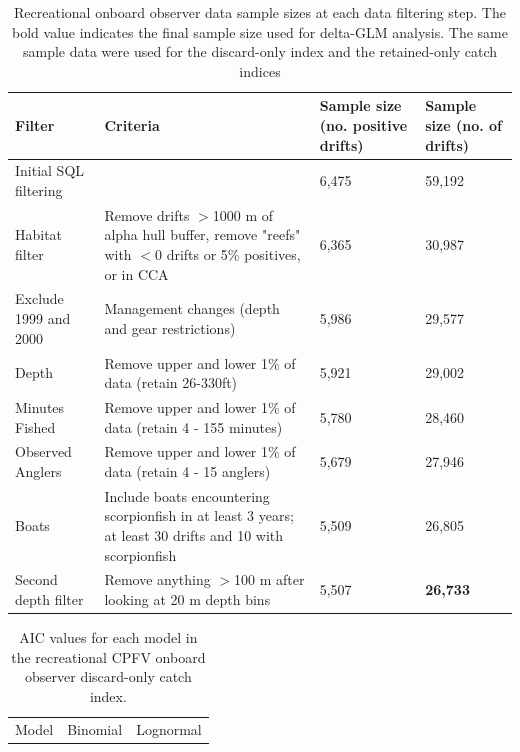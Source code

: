 \documentclass[12pt,]{article}
\begin{document}
\begin{table}[ht]
\centering
\caption{Recreational onboard observer data sample 
                                          sizes at each data filtering step.  
                                          The bold value indicates the final sample size 
                                          used for delta-GLM analysis.
                                          The same sample data were used for the discard-only
                                          index and the retained-only catch indices} 
\label{tab:Fleet6_RecDD_onboard_filter}
\begin{tabular}{>{\raggedright}p{1.5in}>{\raggedright}p{2.6in}>{\raggedright}p{1in}>{\raggedright}p{1in}}
  \hline
Filter & Criteria & Sample size (no. positive drifts) & Sample size (no. of drifts) \\ 
  \hline
Initial SQL filtering &  & 6,475 & 59,192 \\ 
  Habitat filter & Remove drifts $>$1000 m of alpha hull buffer, remove "reefs" with $<$0 drifts or 5\% positives, or in CCA & 6,365 & 30,987 \\ 
  Exclude 1999 and 2000 & Management changes (depth and gear restrictions) & 5,986 & 29,577 \\ 
  Depth & Remove upper and lower 1\% of data (retain 26-330ft) & 5,921 & 29,002 \\ 
  Minutes Fished & Remove upper and lower 1\% of data (retain 4 - 155 minutes) & 5,780 & 28,460 \\ 
  Observed Anglers & Remove upper and lower 1\% of data (retain 4 - 15 anglers) & 5,679 & 27,946 \\ 
  Boats  & Include boats encountering scorpionfish in at least 3 years; at least 30 drifts and 10 with scorpionfish & 5,509 & 26,805 \\ 
  Second depth filter & Remove anything $>$100 m after looking at 20 m depth bins & 5,507 & \textbf{26,733} \\ 
   \hline
\end{tabular}
\end{table}\begin{table}[ht]
\centering
\caption{AIC values for each model in the
                                          recreational CPFV onboard 
                                          observer discard-only catch 
                                          index.} 
\label{tab:Fleet6_RecDD_onboard_aic}
\begin{tabular}{lll}
  \hline
Model & Binomial & Lognormal \\ 

\end{tabular}
\end{table}
\end{document}
